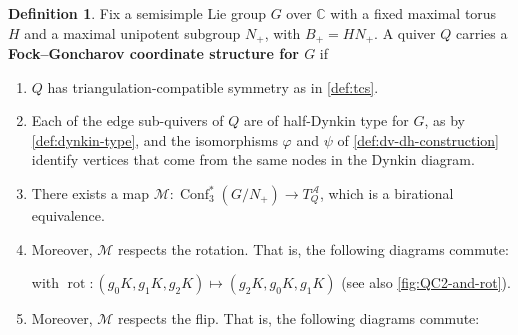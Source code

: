 \documentclass{amsart}
\theoremstyle{plain}
\theoremstyle{definition}
\newtheorem{definition}[theorem]{Definition}
\theoremstyle{remark}
\newcommand{\Qdv}{Q^{0\text{--}2}}
\newcommand{\Qdh}{Q^{1\text{--}3}}
\newcommand{\conftoquiv}{\mathcal{M}}
\newcommand{\defined}[1]{\textbf{#1}}
\newcommand{\muflipind}{{\mu_{\text{flip}}^{\ast}}}
\newcommand{\murotind}{{\mu_{\text{rot}}^{\ast}}}
\newcommand{\seedAtorus}{T^{\mathcal{A}}}
\newcommand{\seedXtorus}{T^{\mathcal{X}}}
\newcommand{\murot}{{\mu_{\text{rot}}}}
\DeclareMathOperator{\Conf}{Conf}
\begin{document}
  \begin{definition}
    \label{def:fgcs}
    Fix a semisimple Lie group $G$ over $\mathbb{C}$ with a fixed
    maximal torus $H$ and a maximal unipotent subgroup $N_{+}$, with
    $B_{+} = HN_{+}$. A quiver $Q$ carries a \defined{Fock--Goncharov
      coordinate structure for $G$ } if
    \begin{enumerate}
    \item
      \label{def:fgcs-1}
      $Q$ has triangulation-compatible symmetry as in \cref{def:tcs}.
    \item
      \label{def:fgcs-2}
      Each of the edge sub-quivers of $Q$ are of half-Dynkin type for
      $G$, as by \cref{def:dynkin-type}, and the isomorphisms $\varphi$
      and $\psi$ of \cref{def:dv-dh-construction} identify vertices that
      come from the same nodes in the Dynkin diagram.
    \item
      \label{def:fgcs-M-is-birational-equivalence}
      There exists a map $\conftoquiv : \Conf_3^{\ast}(G/N_{+}) \to
      \seedAtorus_Q$, which is a birational equivalence.
    \item
      \label{def:fgcs-rot-works}
      Moreover, $\conftoquiv$ respects the rotation. That is, the
      following diagrams commute:

      {\centering

      } with $\operatorname{rot} : (g_0 K, g_1 K, g_2 K) \mapsto (g_2 K,
      g_0 K, g_1 K)$ (see also \cref{fig:QC2-and-rot}).
    \item
      \label{def:fgcs-flip-works}
      Moreover, $\conftoquiv$ respects the flip. That is, the following
      diagrams commute:

      {\centering

}
\end{enumerate}
\end{definition}
\end{document}
